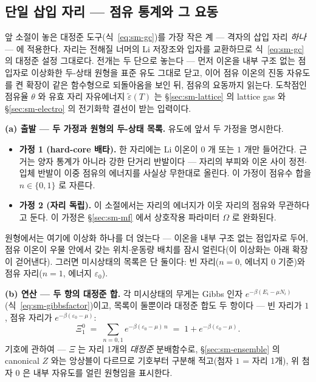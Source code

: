 \subsection{단일 삽입 자리 --- 점유 통계와 그 요동}\label{sec:sm-site}
앞 소절이 놓은 대정준 도구(식~\eqref{eq:sm-gc})를 가장 작은 계 --- 격자의 삽입 자리 \emph{하나} --- 에
적용한다. 자리는 전해질 너머의 Li 저장조와 입자를 교환하므로 식~\eqref{eq:sm-gc} 의 대정준 설정 그대로다.
전개는 두 단으로 놓는다 --- 먼저 이온을 내부 구조 없는 점입자로 이상화한 두-상태 원형을 표준 유도
그대로 닫고, 이어 점유 이온의 진동 자유도를 켠 확장이 같은 함수형으로 되돌아옴을 보인 뒤, 점유의
요동까지 읽는다. 도착점인 점유율 $\theta$ 와 유효 자리 자유에너지 $\tilde\varepsilon(T)$ 는
\S\ref{sec:sm-lattice} 의 lattice gas 와 \S\ref{sec:sm-electro} 의 전기화학 결선이 받는 입력이다.

\textbf{(a) 출발 --- 두 가정과 원형의 두-상태 목록.} 유도에 앞서 두 가정을 명시한다.
\begin{itemize}[leftmargin=2.2em,itemsep=0.1em]
\item \textbf{가정 1 (hard-core 배타).} 한 자리에는 Li 이온이 $0$ 개 또는 $1$ 개만 들어간다. 근거는 양자
통계가 아니라 강한 단거리 반발이다 --- 자리의 부피와 이온 사이 정전$\cdot$입체 반발이 이중 점유의
에너지를 사실상 무한대로 올린다. 이 가정이 점유수 합을 $n\in\{0,1\}$ 로 자른다.
\item \textbf{가정 2 (자리 독립).} 이 소절에서는 자리의 에너지가 이웃 자리의 점유와 무관하다고 둔다.
이 가정은 \S\ref{sec:sm-mf} 에서 상호작용 파라미터 $\Omega$ 로 완화된다.
\end{itemize}
원형에서는 여기에 이상화 하나를 더 얹는다 --- 이온을 내부 구조 없는 점입자로 두어, 점유 이온이 우물
안에서 갖는 위치$\cdot$운동량 배치를 잠시 얼린다(이 이상화는 아래 확장이 걷어낸다). 그러면 미시상태의
목록은 단 둘이다: 빈 자리($n=0$, 에너지 $0$ 기준)와 점유 자리($n=1$, 에너지 $\varepsilon_0$).

\textbf{(b) 연산 --- 두 항의 대정준 합.} 각 미시상태의 무게는 Gibbs 인자
$e^{-\beta(E_i-\mu N_i)}$(식~\eqref{eq:sm-gibbsfactor})이고, 목록이 둘뿐이라 대정준 합도 두 항이다 ---
빈 자리가 $1$, 점유 자리가 $e^{-\beta(\varepsilon_0-\mu)}$:
\begin{equation}
\Xi_1^{0}\;=\;\sum_{n=0,1}e^{-\beta(\varepsilon_0-\mu)\,n}
\;=\;1+e^{-\beta(\varepsilon_0-\mu)}.
\label{eq:sm-baresum}
\end{equation}
기호에 관하여 --- $\Xi$ 는 자리 1개의 \emph{대정준} 분배함수로, \S\ref{sec:sm-ensemble} 의 canonical
$Z$ 와는 앙상블이 다르므로 기호부터 구분해 적고(첨자 $1$ = 자리 1개), 위 첨자 $0$ 은 내부 자유도를 얼린
원형임을 표시한다.

